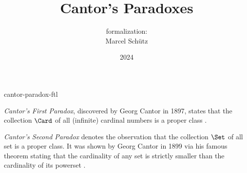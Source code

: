 \documentclass{article}
\title{Cantor's Paradoxes}
\author{\Naproche formalization: \\[0.5em]Marcel Schütz}
\date{2024}
\begin{document}
\begin{smodule}{cantor-paradox-ftl}
  \maketitle
  \hidetlsnumbers


  \noindent \emph{Cantor's First Paradox}, discovered by Georg Cantor in 1897,
  states that the collection $\Card$ of all (infinite) cardinal numbers is a
  proper class \cite[chapter 156]{Cantor1991}.


  \emph{Cantor's Second Paradox} denotes the observation that the collection
  $\Set$ of all set is a proper class.
  It was shown by Georg Cantor in 1899 via his famous theorem stating that the
  cardinality of any set is strictly smaller than the cardinality of its 
  powerset \cite[chapter 163]{Cantor1991}.


  \printbibliography
\end{smodule}
\end{document}
